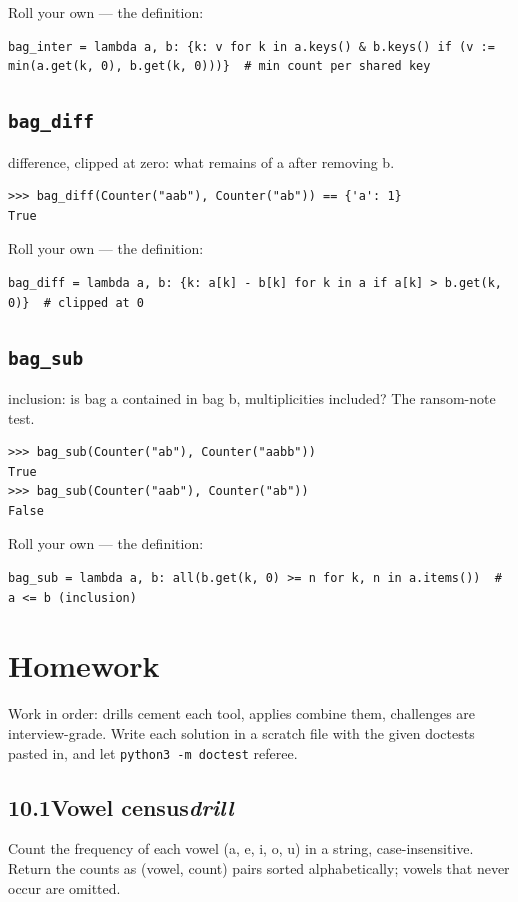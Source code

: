 \documentclass[10pt,letterpaper]{book}
\begin{document}
Roll your own --- the definition:

\begin{lstlisting}[style=ex]
bag_inter = lambda a, b: {k: v for k in a.keys() & b.keys() if (v := min(a.get(k, 0), b.get(k, 0)))}  # min count per shared key
\end{lstlisting}
\subsection{\texttt{bag\_diff}}\label{def:bag-diff}
difference, clipped at zero: what remains of a after removing b.
\begin{lstlisting}[style=ex]
>>> bag_diff(Counter("aab"), Counter("ab")) == {'a': 1}
True
\end{lstlisting}

Roll your own --- the definition:

\begin{lstlisting}[style=ex]
bag_diff = lambda a, b: {k: a[k] - b[k] for k in a if a[k] > b.get(k, 0)}  # clipped at 0
\end{lstlisting}
\subsection{\texttt{bag\_sub}}\label{def:bag-sub}
inclusion: is bag a contained in bag b, multiplicities included? The ransom-note test.
\begin{lstlisting}[style=ex]
>>> bag_sub(Counter("ab"), Counter("aabb"))
True
>>> bag_sub(Counter("aab"), Counter("ab"))
False
\end{lstlisting}

Roll your own --- the definition:

\begin{lstlisting}[style=ex]
bag_sub = lambda a, b: all(b.get(k, 0) >= n for k, n in a.items())  # a <= b (inclusion)
\end{lstlisting}
\section{Homework}
Work in order: drills cement each tool, applies combine them,
challenges are interview-grade. Write each solution in a scratch file with
the given doctests pasted in, and let \texttt{python3 -m doctest} referee.
\subsection*{10.1\quad Vowel census\hfill\textnormal{\textit{drill}}}
Count the frequency of each vowel (a, e, i, o, u) in a string, case-insensitive. Return the counts as (vowel, count) pairs sorted alphabetically; vowels that never occur are omitted.
\end{document}
